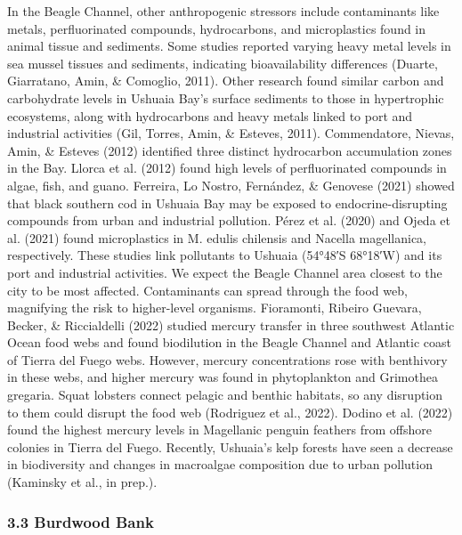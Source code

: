\documentclass[
]{article}
\begin{document}
In the Beagle Channel, other anthropogenic stressors include
contaminants like metals, perfluorinated compounds, hydrocarbons, and
microplastics found in animal tissue and sediments. Some studies
reported varying heavy metal levels in sea mussel tissues and sediments,
indicating bioavailability differences (Duarte, Giarratano, Amin, \&
Comoglio, 2011). Other research found similar carbon and carbohydrate
levels in Ushuaia Bay's surface sediments to those in hypertrophic
ecosystems, along with hydrocarbons and heavy metals linked to port and
industrial activities (Gil, Torres, Amin, \& Esteves, 2011).
Commendatore, Nievas, Amin, \& Esteves (2012) identified three distinct
hydrocarbon accumulation zones in the Bay. Llorca et al. (2012) found
high levels of perfluorinated compounds in algae, fish, and guano.
Ferreira, Lo Nostro, Fernández, \& Genovese (2021) showed that black
southern cod in Ushuaia Bay may be exposed to endocrine-disrupting
compounds from urban and industrial pollution. Pérez et al. (2020) and
Ojeda et al. (2021) found microplastics in M. edulis chilensis and
Nacella magellanica, respectively. These studies link pollutants to
Ushuaia (54°48′S 68°18′W) and its port and industrial activities. We
expect the Beagle Channel area closest to the city to be most affected.
Contaminants can spread through the food web, magnifying the risk to
higher-level organisms. Fioramonti, Ribeiro Guevara, Becker, \&
Riccialdelli (2022) studied mercury transfer in three southwest Atlantic
Ocean food webs and found biodilution in the Beagle Channel and Atlantic
coast of Tierra del Fuego webs. However, mercury concentrations rose
with benthivory in these webs, and higher mercury was found in
phytoplankton and Grimothea gregaria. Squat lobsters connect pelagic and
benthic habitats, so any disruption to them could disrupt the food web
(Rodriguez et al., 2022). Dodino et al. (2022) found the highest mercury
levels in Magellanic penguin feathers from offshore colonies in Tierra
del Fuego. Recently, Ushuaia's kelp forests have seen a decrease in
biodiversity and changes in macroalgae composition due to urban
pollution (Kaminsky et al., in prep.).

\subsubsection{3.3 Burdwood Bank}\label{burdwood-bank}
\end{document}
